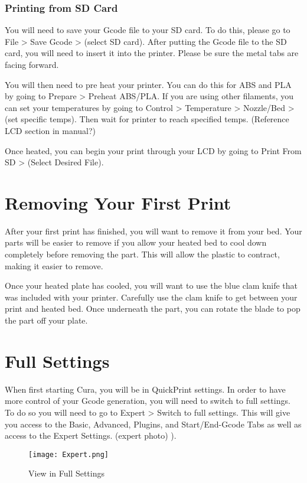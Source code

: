 \subsubsection{Printing from SD Card}

You will need to save your Gcode file to your SD card. To do this, please go to File > Save Gcode > (select SD card). After putting the Gcode file to the SD card, you will need to insert it into the printer. Please be sure the metal tabs are facing forward. 

You will then need to pre heat your printer. You can do this for ABS and PLA by going to Prepare > Preheat ABS/PLA. If you are using other filaments, you can set your temperatures by going to Control > Temperature > Nozzle/Bed > (set specific temps). Then wait for printer to reach specified temps. (Reference LCD section in manual?)

Once heated, you can begin your print through your LCD by going to Print From SD > (Select Desired File).

\section{Removing Your First Print}

After your first print has finished, you will want to remove it from your bed. Your parts will be easier to remove if you allow your heated bed to cool down completely before removing the part. This will allow the plastic to contract, making it easier to remove.

Once your heated plate has cooled, you will want to use the blue clam knife that was included with your printer. Carefully use the clam knife to get between your print and heated bed. Once underneath the part, you can rotate the blade to pop the part off your plate.

\section{Full Settings}

When first starting Cura, you will be in QuickPrint settings. In order to have more control of your Gcode generation, you will need to switch to full settings. To do so you will need to go to Expert > Switch to full settings. This will give you access to the Basic, Advanced, Plugins, and Start/End-Gcode Tabs as well as access to the Expert Settings. (expert photo)
\pageref{fig:Expert Options}).
\begin{figure}[hbt]
\centering
\texttt{[image: Expert.png]}
\caption{View in Full Settings}
\label{fig:Full Settings View}
\end{figure}

